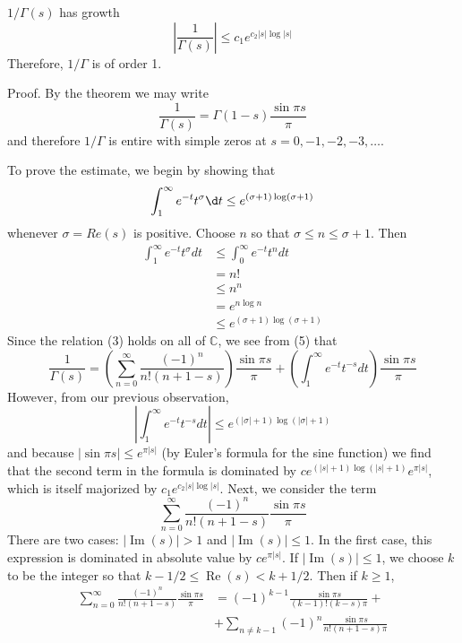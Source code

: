 \documentclass[12pt, oneside]{book}
\begin{document}
\begin{theorem}
    $1 / \Gamma(s)$ has growth
    $$
        \left|\frac{1}{\Gamma(s)}\right| \leq c_1 e^{c_2|s| \log |s|}
    $$
    Therefore, $1 / \Gamma$ is of order 1.


    Proof. By the theorem we may write
    $$\frac{1}{\Gamma(s)}=\Gamma(1-s) \frac{\sin \pi s}{\pi}$$
    and therefore $1 / \Gamma$ is entire with simple zeros at $s=0,-1,-2,-3, \ldots$.

    To prove the estimate, we begin by showing that
    $$\int_1^{\infty} e^{-t} t^\sigma\d  t \leq e^{(\sigma+1) \log (\sigma+1)}$$
    whenever $\sigma=Re(s)$ is positive. Choose $n$ so that $\sigma \leq n \leq \sigma+1$. Then
    $$\begin{aligned}
            \int_1^{\infty} e^{-t} t^\sigma d t & \leq \int_0^{\infty} e^{-t} t^n d t \\
                                                & =n!                                 \\
                                                & \leq n^n                            \\
                                                & =e^{n \log n}                       \\
                                                & \leq e^{(\sigma+1) \log (\sigma+1)}
        \end{aligned}$$
    Since the relation (3) holds on all of $\mathbb{C}$, we see from (5) that
    $$\frac{1}{\Gamma(s)}=\left(\sum_{n=0}^{\infty} \frac{(-1)^n}{n!(n+1-s)}\right) \frac{\sin \pi s}{\pi}+\left(\int_1^{\infty} e^{-t} t^{-s} d t\right) \frac{\sin \pi s}{\pi}$$
    However, from our previous observation,
    $$\left|\int_1^{\infty} e^{-t} t^{-s} d t\right|\leq e^{(|\sigma|+1) \log (|\sigma|+1)}$$
    and because $|\sin \pi s| \leq e^{\pi|s|}$ (by Euler's formula for the sine function) we find that the second term in the formula is dominated by $c e^{(|s|+1) \log (|s|+1)} e^{\pi|s|}$, which is itself majorized by $c_1 e^{c_2|s| \log |s|}$. Next, we consider the term
    $$\sum_{n=0}^{\infty} \frac{(-1)^n}{n!(n+1-s)} \frac{\sin \pi s}{\pi}$$
    There are two cases: $|\operatorname{Im}(s)|>1$ and $|\operatorname{Im}(s)| \leq 1$. In the first case, this expression is dominated in absolute value by $c e^{\pi|s|}$. If $|\operatorname{Im}(s)| \leq 1$, we choose $k$ to be the integer so that $k-1 / 2 \leq \operatorname{Re}(s)<k+1 / 2$. Then if $k \geq 1$,
    $$
        \begin{aligned}
            \sum_{n=0}^{\infty} \frac{(-1)^n}{n!(n+1-s)} \frac{\sin \pi s}{\pi} & =(-1)^{k-1} \frac{\sin \pi s}{(k-1)!(k-s) \pi}+           \\
                                                                                & +\sum_{n \neq k-1}(-1)^n \frac{\sin \pi s}{n!(n+1-s) \pi}
        \end{aligned}
    $$


\end{theorem}
\end{document}
